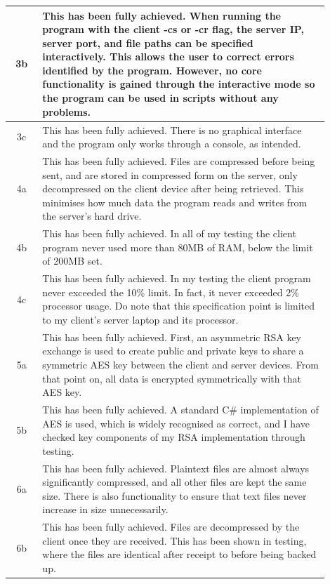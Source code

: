 \documentclass[../main.tex]{subfiles}
\begin{document}
\begin{longtable}{|c|p{0.9\linewidth}|}
3b & This has been fully achieved. When running the program with the client -cs or -cr flag, the server IP, server port, and file paths can be specified interactively. This allows the user to correct errors identified by the program. However, no core functionality is gained through the interactive mode so the program can be used in scripts without any problems. \\
\hline

3c & This has been fully achieved. There is no graphical interface and the program only works through a console, as intended. \\
\hline

4a & This has been fully achieved. Files are compressed before being sent, and are stored in compressed form on the server, only decompressed on the client device after being retrieved. This minimises how much data the program reads and writes from the server’s hard drive. \\
\hline

4b & This has been fully achieved. In all of my testing the client program never used more than 80MB of RAM, below the limit of 200MB set. \\
\hline

4c & This has been fully achieved. In my testing the client program never exceeded the 10\% limit. In fact, it never exceeded 2\% processor usage. Do note that this specification point is limited to my client’s server laptop and its processor. \\
\hline

5a & This has been fully achieved. First, an asymmetric RSA key exchange is used to create public and private keys to share a symmetric AES key between the client and server devices. From that point on, all data is encrypted symmetrically with that AES key. \\
\hline

5b & This has been fully achieved. A standard C\# implementation of AES is used, which is widely recognised as correct, and I have checked key components of my RSA implementation through testing. \\
\hline

6a & This has been fully achieved. Plaintext files are almost always significantly compressed, and all other files are kept the same size. There is also functionality to ensure that text files never increase in size unnecessarily. \\
\hline

6b & This has been fully achieved. Files are decompressed by the client once they are received. This has been shown in testing, where the files are identical after receipt to before being backed up. \\
\hline


\end{longtable}
\end{document}
